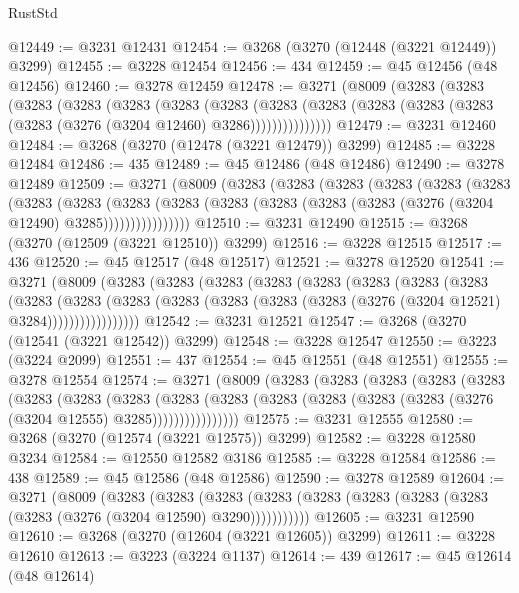 \begin{lexlean}{RustStd}
\begin{coremodule}
@12449 := @3231 @12431
@12454 := @3268 (@3270 (@12448 (@3221 @12449)) @3299)
@12455 := @3228 @12454
@12456 := 434
@12459 := @45 @12456 (@48 @12456)
@12460 := @3278 @12459
@12478 := @3271
    (@8009
      (@3283
        (@3283
          (@3283
            (@3283
              (@3283
                (@3283
                  (@3283
                    (@3283
                      (@3283 (@3283 (@3283 (@3283 (@3283 (@3276 (@3204 @12460) @3286)))))))))))))))
@12479 := @3231 @12460
@12484 := @3268 (@3270 (@12478 (@3221 @12479)) @3299)
@12485 := @3228 @12484
@12486 := 435
@12489 := @45 @12486 (@48 @12486)
@12490 := @3278 @12489
@12509 := @3271
    (@8009
      (@3283
        (@3283
          (@3283
            (@3283
              (@3283
                (@3283
                  (@3283
                    (@3283
                      (@3283
                        (@3283
                          (@3283 (@3283 (@3283 (@3283 (@3276 (@3204 @12490) @3285))))))))))))))))
@12510 := @3231 @12490
@12515 := @3268 (@3270 (@12509 (@3221 @12510)) @3299)
@12516 := @3228 @12515
@12517 := 436
@12520 := @45 @12517 (@48 @12517)
@12521 := @3278 @12520
@12541 := @3271
    (@8009
      (@3283
        (@3283
          (@3283
            (@3283
              (@3283
                (@3283
                  (@3283
                    (@3283
                      (@3283
                        (@3283
                          (@3283
                            (@3283 (@3283 (@3283 (@3283 (@3276 (@3204 @12521) @3284)))))))))))))))))
@12542 := @3231 @12521
@12547 := @3268 (@3270 (@12541 (@3221 @12542)) @3299)
@12548 := @3228 @12547
@12550 := @3223 (@3224 @2099)
@12551 := 437
@12554 := @45 @12551 (@48 @12551)
@12555 := @3278 @12554
@12574 := @3271
    (@8009
      (@3283
        (@3283
          (@3283
            (@3283
              (@3283
                (@3283
                  (@3283
                    (@3283
                      (@3283
                        (@3283
                          (@3283 (@3283 (@3283 (@3283 (@3276 (@3204 @12555) @3285))))))))))))))))
@12575 := @3231 @12555
@12580 := @3268 (@3270 (@12574 (@3221 @12575)) @3299)
@12582 := @3228 @12580 @3234
@12584 := @12550 @12582 @3186
@12585 := @3228 @12584
@12586 := 438
@12589 := @45 @12586 (@48 @12586)
@12590 := @3278 @12589
@12604 := @3271
    (@8009
      (@3283
        (@3283
          (@3283 (@3283 (@3283 (@3283 (@3283 (@3283 (@3283 (@3276 (@3204 @12590) @3290)))))))))))
@12605 := @3231 @12590
@12610 := @3268 (@3270 (@12604 (@3221 @12605)) @3299)
@12611 := @3228 @12610
@12613 := @3223 (@3224 @1137)
@12614 := 439
@12617 := @45 @12614 (@48 @12614)

\end{coremodule}
\end{lexlean}
